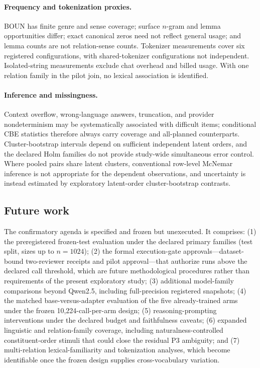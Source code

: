 \paragraph{Frequency and tokenization proxies.}
BOUN has finite genre and sense coverage; surface $n$-gram and lemma opportunities differ; exact canonical
zeros need not reflect general usage; and lemma counts are not relation-sense counts. Tokenizer
measurements cover six registered configurations, with shared-tokenizer configurations not independent.
Isolated-string measurements exclude chat overhead and billed usage. With one relation family in the pilot
join, no lexical association is identified.

\paragraph{Inference and missingness.}
Context overflow, wrong-language answers, truncation, and provider nondeterminism may be systematically
associated with difficult items; conditional CBE statistics therefore always carry coverage and
all-planned counterparts. Cluster-bootstrap intervals depend on sufficient independent latent orders, and
the declared Holm families do not provide study-wide simultaneous error control. Where pooled pairs share
latent clusters, conventional row-level McNemar inference is not appropriate for the dependent
observations, and uncertainty is instead estimated by exploratory latent-order cluster-bootstrap
contrasts.

\subsection{Future work}
\label{sec:future}

The confirmatory agenda is specified and frozen but unexecuted. It comprises: (1) the preregistered
frozen-test evaluation under the declared primary families (test split, sizes up to $n = 1024$);
(2) the formal execution-gate approvals---dataset-bound two-reviewer receipts and pilot approval---that
authorize runs above the declared call threshold, which are future methodological procedures rather than
requirements of the present exploratory study; (3) additional model-family comparisons beyond Qwen2.5,
including full-precision registered snapshots; (4) the matched base-versus-adapter evaluation of the five
already-trained arms under the frozen 10,224-call-per-arm design; (5) reasoning-prompting interventions
under the declared budget and faithfulness caveats; (6) expanded linguistic and relation-family coverage,
including naturalness-controlled constituent-order stimuli that could close the residual P3 ambiguity; and
(7) multi-relation lexical-familiarity and tokenization analyses, which become identifiable once the
frozen design supplies cross-vocabulary variation.
